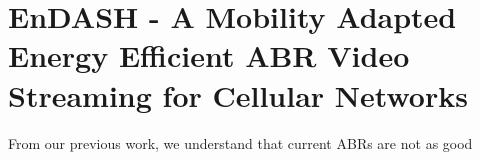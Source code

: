 \section{EnDASH - A Mobility Adapted Energy Efficient ABR Video Streaming for Cellular Networks}
From our previous work, we understand that current ABRs are not as good 